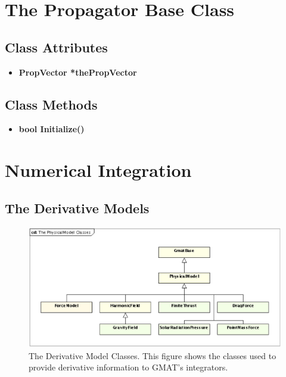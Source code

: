 \section{The Propagator Base Class}

\subsection{Class Attributes}

\begin{itemize}
\item \textbf{PropVector *thePropVector}
\end{itemize}

\subsection{Class Methods}

\begin{itemize}
\item \textbf{bool Initialize()}
\end{itemize}

\section{Numerical Integration}


\subsection{\label{section:TheODEModel} The Derivative Models}

\begin{figure}[htb]
\begin{center}
\includegraphics[scale=0.5]{Images/ThePhysicalModelClasses.eps}
\caption[The Derivative Model Classes]{\label{figure:PhysicalModelClasses}The Derivative Model
Classes.  This figure shows the classes used to provide derivative information to GMAT's
integrators.}
\end{center}
\end{figure}

